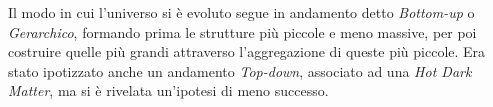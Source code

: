 Il modo in cui l'universo si è evoluto segue in andamento detto \emph{Bottom-up} o \emph{Gerarchico}, formando prima le strutture più piccole e meno massive, per poi costruire quelle più grandi attraverso l'aggregazione di queste più piccole. Era stato ipotizzato anche un andamento \emph{Top-down}, associato ad una \emph{Hot Dark Matter}, ma si è rivelata un'ipotesi di meno successo.